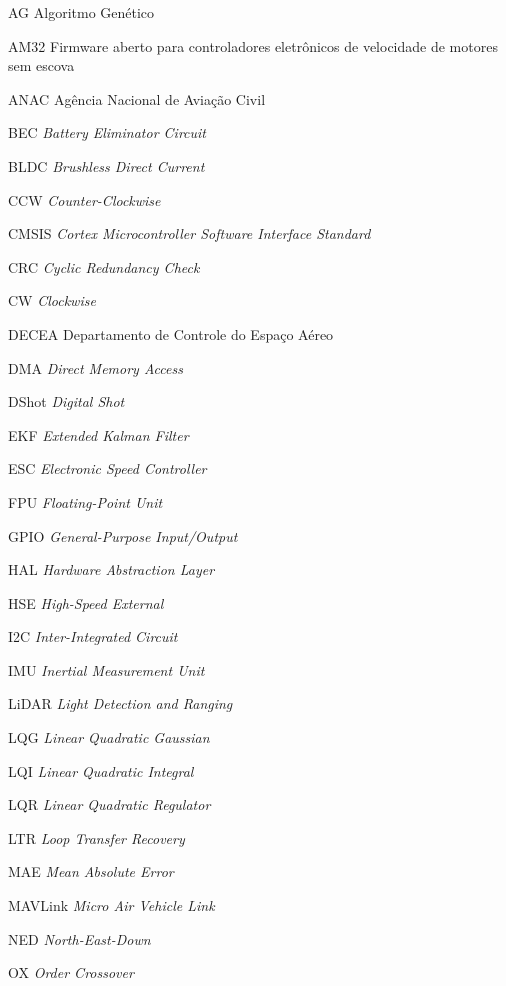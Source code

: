 \begin{siglas}
    \item[AG] Algoritmo Genético
    \item[AM32] Firmware aberto para controladores eletrônicos de velocidade de motores sem escova
    \item[ANAC] Agência Nacional de Aviação Civil
    \item[BEC] \textit{Battery Eliminator Circuit}
    \item[BLDC] \textit{Brushless Direct Current}
    \item[CCW] \textit{Counter-Clockwise}
    \item[CMSIS] \textit{Cortex Microcontroller Software Interface Standard}
    \item[CRC] \textit{Cyclic Redundancy Check}
    \item[CW] \textit{Clockwise}
    \item[DECEA] Departamento de Controle do Espaço Aéreo
    \item[DMA] \textit{Direct Memory Access}
    \item[DShot] \textit{Digital Shot}
    \item[EKF] \textit{Extended Kalman Filter}
    \item[ESC] \textit{Electronic Speed Controller}
    \item[FPU] \textit{Floating-Point Unit}
    \item[GPIO] \textit{General-Purpose Input/Output}
    \item[HAL] \textit{Hardware Abstraction Layer}
    \item[HSE] \textit{High-Speed External}
    \item[I2C] \textit{Inter-Integrated Circuit}
    \item[IMU] \textit{Inertial Measurement Unit}
    \item[LiDAR] \textit{Light Detection and Ranging}
    \item[LQG] \textit{Linear Quadratic Gaussian}
    \item[LQI] \textit{Linear Quadratic Integral}
    \item[LQR] \textit{Linear Quadratic Regulator}
    \item[LTR] \textit{Loop Transfer Recovery}
    \item[MAE] \textit{Mean Absolute Error}
    \item[MAVLink] \textit{Micro Air Vehicle Link}
    \item[NED] \textit{North-East-Down}
    \item[OX] \textit{Order Crossover}

\end{siglas}
